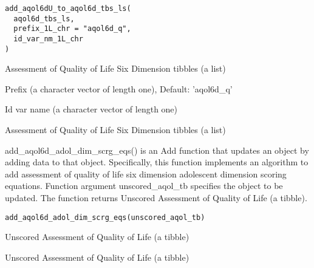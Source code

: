\documentclass[a4paper]{book}
\begin{document}
%
\begin{Usage}
\begin{verbatim}
add_aqol6dU_to_aqol6d_tbs_ls(
  aqol6d_tbs_ls,
  prefix_1L_chr = "aqol6d_q",
  id_var_nm_1L_chr
)
\end{verbatim}
\end{Usage}
%
\begin{Arguments}
\begin{ldescription}
\item[\code{aqol6d\_tbs\_ls}] Assessment of Quality of Life Six Dimension tibbles (a list)

\item[\code{prefix\_1L\_chr}] Prefix (a character vector of length one), Default: 'aqol6d\_q'

\item[\code{id\_var\_nm\_1L\_chr}] Id var name (a character vector of length one)
\end{ldescription}
\end{Arguments}
%
\begin{Value}
Assessment of Quality of Life Six Dimension tibbles (a list)
\end{Value}
%
\begin{Description}\relax
add\_aqol6d\_adol\_dim\_scrg\_eqs() is an Add function that updates an object by adding data to that object. Specifically, this function implements an algorithm to add assessment of quality of life six dimension adolescent dimension scoring equations. Function argument unscored\_aqol\_tb specifies the object to be updated. The function returns Unscored Assessment of Quality of Life (a tibble).
\end{Description}
%
\begin{Usage}
\begin{verbatim}
add_aqol6d_adol_dim_scrg_eqs(unscored_aqol_tb)
\end{verbatim}
\end{Usage}
%
\begin{Arguments}
\begin{ldescription}
\item[\code{unscored\_aqol\_tb}] Unscored Assessment of Quality of Life (a tibble)
\end{ldescription}
\end{Arguments}
%
\begin{Value}
Unscored Assessment of Quality of Life (a tibble)
\end{Value}
\end{document}
